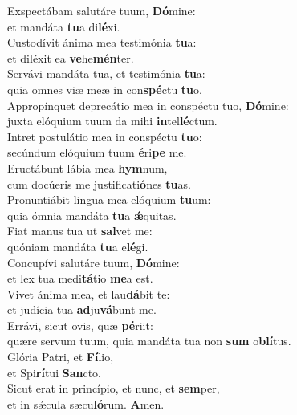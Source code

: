 \evenverse Exspectábam salutáre tuum, \textbf{Dó}mine:~\*\\
\evenverse et mandáta \textbf{tu}a di\textbf{lé}xi.\\
\oddverse Custodívit ánima mea testimónia \textbf{tu}a:~\*\\
\oddverse et diléxit ea \textbf{ve}he\textbf{mén}ter.\\
\evenverse Servávi mandáta tua, et testimónia \textbf{tu}a:~\*\\
\evenverse quia omnes viæ meæ in con\textbf{spé}ctu \textbf{tu}o.\\
\oddverse Appropínquet deprecátio mea in conspéctu tuo, \textbf{Dó}mine:~\*\\
\oddverse juxta elóquium tuum da mihi \textbf{in}tel\textbf{lé}ctum.\\
\evenverse Intret postulátio mea in conspéctu \textbf{tu}o:~\*\\
\evenverse secúndum elóquium tuum \textbf{é}ri\textbf{pe} me.\\
\oddverse Eructábunt lábia mea \textbf{hym}num,~\*\\
\oddverse cum docúeris me justificati\textbf{ó}nes \textbf{tu}as.\\
\evenverse Pronuntiábit lingua mea elóquium \textbf{tu}um:~\*\\
\evenverse quia ómnia mandáta \textbf{tu}a \textbf{ǽ}quitas.\\
\oddverse Fiat manus tua ut \textbf{sal}vet me:~\*\\
\oddverse quóniam mandáta \textbf{tu}a e\textbf{lé}gi.\\
\evenverse Concupívi salutáre tuum, \textbf{Dó}mine:~\*\\
\evenverse et lex tua medi\textbf{tá}tio \textbf{me}a est.\\
\oddverse Vivet ánima mea, et lau\textbf{dá}bit te:~\*\\
\oddverse et judícia tua \textbf{ad}ju\textbf{vá}bunt me.\\
\evenverse Errávi, sicut ovis, quæ \textbf{pé}riit:~\*\\
\evenverse quære servum tuum, quia mandáta tua non \textbf{sum} o\textbf{blí}tus.\\
\oddverse Glória Patri, et \textbf{Fí}lio,~\*\\
\oddverse et Spi\textbf{rí}tui \textbf{San}cto.\\
\evenverse Sicut erat in princípio, et nunc, et \textbf{sem}per,~\*\\
\evenverse et in sǽcula sæcu\textbf{ló}rum. \textbf{A}men.\\
